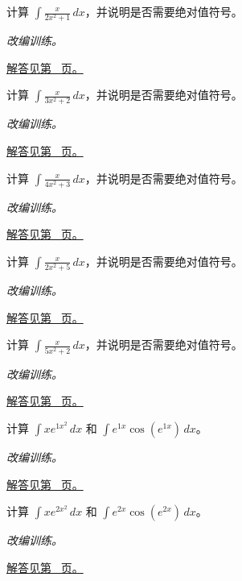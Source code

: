 \documentclass[12pt,fontset=fandol]{ctexart}
\begin{document}
\begin{example}[分母导数型积分]\label{ex:c12q8}
计算 $\displaystyle\int\frac{x}{2x^2+1}\,dx$，并说明是否需要绝对值符号。
\par\textit{改编训练。}\par\hyperref[ans:c12q8]{解答见第~\pageref{ans:c12q8} 页。}
\end{example}
\begin{example}[分母导数型积分]\label{ex:c12q9}
计算 $\displaystyle\int\frac{x}{3x^2+2}\,dx$，并说明是否需要绝对值符号。
\par\textit{改编训练。}\par\hyperref[ans:c12q9]{解答见第~\pageref{ans:c12q9} 页。}
\end{example}
\begin{example}[分母导数型积分]\label{ex:c12q10}
计算 $\displaystyle\int\frac{x}{4x^2+3}\,dx$，并说明是否需要绝对值符号。
\par\textit{改编训练。}\par\hyperref[ans:c12q10]{解答见第~\pageref{ans:c12q10} 页。}
\end{example}
\begin{example}[分母导数型积分]\label{ex:c12q11}
计算 $\displaystyle\int\frac{x}{2x^2+5}\,dx$，并说明是否需要绝对值符号。
\par\textit{改编训练。}\par\hyperref[ans:c12q11]{解答见第~\pageref{ans:c12q11} 页。}
\end{example}
\begin{example}[分母导数型积分]\label{ex:c12q12}
计算 $\displaystyle\int\frac{x}{5x^2+2}\,dx$，并说明是否需要绝对值符号。
\par\textit{改编训练。}\par\hyperref[ans:c12q12]{解答见第~\pageref{ans:c12q12} 页。}
\end{example}
\begin{example}[指数复合的反向链式法则]\label{ex:c12q13}
计算 $\displaystyle\int x e^{1x^2}\,dx$ 和 $\displaystyle\int e^{1x}\cos(e^{1x})\,dx$。
\par\textit{改编训练。}\par\hyperref[ans:c12q13]{解答见第~\pageref{ans:c12q13} 页。}
\end{example}
\begin{example}[指数复合的反向链式法则]\label{ex:c12q14}
计算 $\displaystyle\int x e^{2x^2}\,dx$ 和 $\displaystyle\int e^{2x}\cos(e^{2x})\,dx$。
\par\textit{改编训练。}\par\hyperref[ans:c12q14]{解答见第~\pageref{ans:c12q14} 页。}
\end{example}
\end{document}
